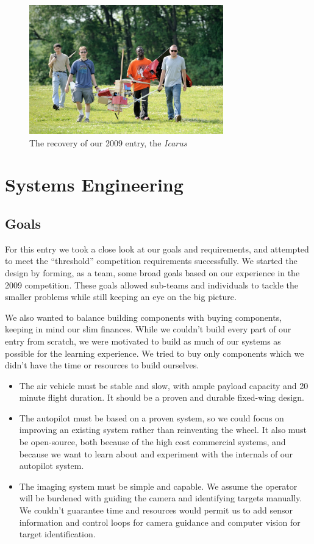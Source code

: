 \documentclass[pdftex,10pt,letter]{article}
\begin{document}
\begin{figure}[b!]
	\centering
	\includegraphics[width=0.75\textwidth]{../images/wreckage.jpg}
	\caption{The recovery of our 2009 entry, the \emph{Icarus}}
	\label{fig:wreckage}
\end{figure}

\newpage
\section{Systems Engineering}
\subsection{Goals}
For this entry we took a close look at our goals and requirements, and attempted to meet the ``threshold'' competition requirements successfully.
We started the design by forming, as a team, some broad goals based on our experience in the 2009 competition.
These goals allowed sub-teams and individuals to tackle the smaller problems while still keeping an eye on the big picture. 

We also wanted to balance building components with buying components, keeping in mind our slim finances. While we couldn't build every part of our entry from scratch, we were motivated to build as much of our systems as possible for the learning experience. We tried to buy only components which we didn't have the time or resources to build ourselves.


\begin{itemize}
	\item The air vehicle must be stable and slow, with ample payload capacity and 20 minute flight duration. It should be a proven and durable fixed-wing design.
	\item The autopilot must be based on a proven system, so we could focus on improving an existing system rather than reinventing the wheel. It also must be open-source, both because of the high cost commercial systems, and because we want to learn about and experiment with the internals of our autopilot system.
	\item The imaging system must be simple and capable. We assume the operator will be burdened with guiding the camera and identifying targets manually. We couldn't guarantee time and resources would permit us to add sensor information and control loops for camera guidance and computer vision for target identification.
\end{itemize}
\end{document}
